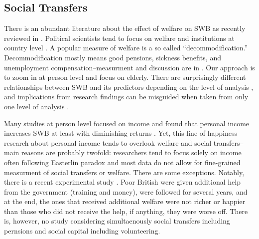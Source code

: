 \documentclass[10pt, letterpaper]{article}
\begin{document}
\begin{spacing}{1.4}
\section{Social Transfers}

There is an abundant literature about the effect of welfare on SWB as recently
reviewed in \citet{aokJap14}. {Political scientists tend to focus on welfare and institutions at country
level \citep{alvarez09,pacek08b,radcliff13,pacek08r,radcliff01,bok10}. A popular
measure of welfare is a so called ``decommodification.'' %
Decommodification mostly means good pensions, sickness benefits,
and unemployment compensation--measurment and discussion are in  \citet{scruggs06Ba}. Our approach is to zoom
in at person level and focus on elderly.} %
%
 There are surprisingly different relationships between SWB and its predictors
 depending on the level of analysis \citep{ashkanasy11}, and implications from research findings can be
misguided when taken from only one level of analysis \citep{klein00}.

Many studies at person level focused on income and found that 
personal  income  increases SWB at least with diminishing returns
\citep{aok_ruut_inc_ine,kahneman10,frijters04,kushlev15,dolan08al,veenhoven12}. Yet,
this line of happiness research about personal income tends to overlook welfare
and social transfers--main reasons are probably twofold: researchers tend to
focus solely on income often following Easterlin paradox \citep{easterlin10B} and most data do
not allow for fine-grained measurment of social transfers or welfare. 
%
There are some exceptions. Notably, there is a recent experimental study \citep{oswald14}. Poor British
were given additional help from the government (training and money),  
were followed for several years, and at the end, the ones that received
additional welfare were not richer or happier than those who did not receive the
 help, if anything, they
were worse off. There is, however, no study considering simultaenously social transfers
including pernsions and social capital including volunteering.


\end{spacing}
\end{document}
